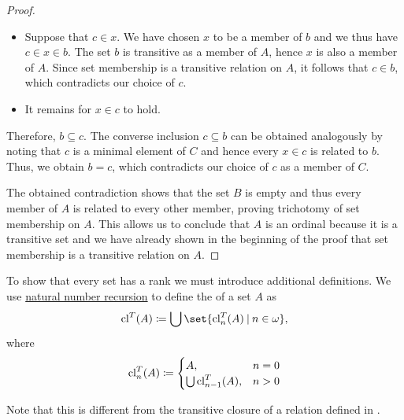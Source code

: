 \begin{proof}
\begin{itemize}
    \item Suppose that \( c \in x \). We have chosen \( x \) to be a member of \( b \) and we thus have \( c \in x \in b \). The set \( b \) is transitive as a member of \( A \), hence \( x \) is also a member of \( A \). Since set membership is a transitive relation on \( A \), it follows that \( c \in b \), which contradicts our choice of \( c \).

    \item It remains for \( x \in c \) to hold.
  \end{itemize}

  Therefore, \( b \subseteq c \). The converse inclusion \( c \subseteq b \) can be obtained analogously by noting that \( c \) is a minimal element of \( C \) and hence every \( x \in c \) is related to \( b \). Thus, we obtain \( b = c \), which contradicts our choice of \( c \) as a member of \( C \).

  The obtained contradiction shows that the set \( B \) is empty and thus every member of \( A \) is related to every other member, proving trichotomy of set membership on \( A \). This allows us to conclude that \( A \) is an ordinal because it is a transitive set and we have already shown in the beginning of the proof that set membership is a transitive relation on \( A \).
\end{proof}

\begin{definition}\label{def:transitive_closure_of_a_set}
  To show that every set has a rank we must introduce additional definitions. We use \hyperref[rem:natural_number_recursion]{natural number recursion} to define the  of a set \( A \) as
  \begin{equation*}
    \cl^T(A) \coloneqq \bigcup \set{ \cl_n^T(A) \given n \in \omega },
  \end{equation*}
  where
  \begin{equation*}
    \operatorname{cl}_n^T(A) \coloneqq \begin{cases}
      A,                      &n = 0 \\
      \bigcup \operatorname{cl}_{n-1}^T(A), &n > 0
    \end{cases}
  \end{equation*}

  Note that this is different from the transitive closure of a relation defined in .
\end{definition}


